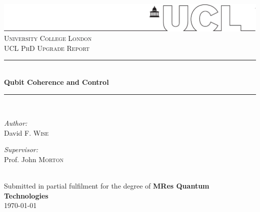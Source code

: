 \begin{titlepage}
\vspace*{-1in}\hspace*{-1.5in}\includegraphics[width=1.02\paperwidth]{UCLlogo}
\newcommand{\HRule}{\rule{\linewidth}{0.5mm}} %
\null\vfil
\center %
 \textsc{\LARGE University College London}
\\[1cm]
\textsc{\Large UCL PhD Upgrade Report}\\[0.5cm] %


\HRule \\[0.2cm]
{\LARGE \bfseries Qubit Coherence and Control}\\[-0.2cm]
\HRule \\[1.2cm]

\begin{minipage}[t]{0.4\textwidth}
\begin{flushleft} \large
\emph{Author:}\\
David F. \textsc{Wise}%
\end{flushleft}
\end{minipage}
\begin{minipage}[t]{0.4\textwidth}
\begin{flushright} \large
\emph{Supervisor:} \\
Prof. John \textsc{Morton} \\%
\end{flushright}
\end{minipage}\\[2cm]
\large Submitted in partial fulfilment for the degree of \textbf{MRes Quantum Technologies}
\\[2.45cm]

{\large \today}\\%


\null\vfil %
\end{titlepage}
